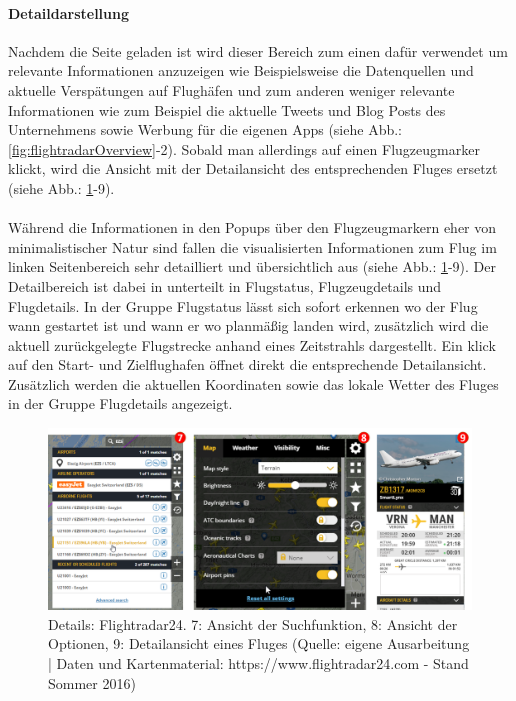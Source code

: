 \documentclass[../Bachelorarbeit.tex]{subfiles}
\begin{document}
\paragraph{Detaildarstellung}
\label{flightradarDetaildarstellung}
Nachdem die Seite geladen ist wird dieser Bereich zum einen dafür verwendet um relevante Informationen anzuzeigen wie Beispielsweise die Datenquellen und aktuelle Verspätungen auf Flughäfen und zum anderen weniger relevante Informationen wie zum Beispiel die aktuelle Tweets und Blog Posts des Unternehmens sowie Werbung für die eigenen Apps (siehe Abb.: \ref{fig:flightradarOverview}-2). 
Sobald man allerdings auf einen Flugzeugmarker klickt, wird die Ansicht mit der Detailansicht des entsprechenden Fluges ersetzt (siehe Abb.: \ref{fig:flightradarDetail}-9).\\
\\
Während die Informationen in den Popups über den Flugzeugmarkern eher von minimalistischer Natur sind fallen die visualisierten Informationen zum Flug im linken Seitenbereich sehr detailliert und übersichtlich aus (siehe Abb.: \ref{fig:flightradarDetail}-9). 
Der Detailbereich ist dabei in unterteilt in Flugstatus, Flugzeugdetails und Flugdetails.
In der Gruppe Flugstatus lässt sich sofort erkennen wo der Flug wann gestartet ist und wann er wo planmäßig landen wird, zusätzlich wird die aktuell zurückgelegte Flugstrecke anhand eines Zeitstrahls dargestellt.
Ein klick auf den Start- und Zielflughafen öffnet direkt die entsprechende Detailansicht.
Zusätzlich werden die aktuellen Koordinaten sowie das lokale Wetter des Fluges in der Gruppe Flugdetails angezeigt. 

\begin{figure}[H]
\centering
\includegraphics[width=1\linewidth]{img/StandDerTechnik/flightradarDetail}
\caption[Details: Flightradar24]{Details: Flightradar24. 7: Ansicht der Suchfunktion, 8: Ansicht der Optionen, 9: Detailansicht eines Fluges (Quelle: eigene Ausarbeitung | Daten und Kartenmaterial: https://www.flightradar24.com - Stand Sommer 2016)}
\label{fig:flightradarDetail}
\end{figure}
\end{document}
